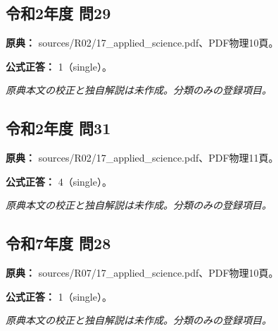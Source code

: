 \subsection{令和2年度 問29}
\label{q:r02-reg-applied-29}

\noindent\textbf{原典：} sources/R02/17\_applied\_science.pdf、PDF物理10頁。

\textbf{公式正答：} 1（single）。

\par\textit{原典本文の校正と独自解説は未作成。分類のみの登録項目。}

\subsection{令和2年度 問31}
\label{q:r02-reg-applied-31}

\noindent\textbf{原典：} sources/R02/17\_applied\_science.pdf、PDF物理11頁。

\textbf{公式正答：} 4（single）。

\par\textit{原典本文の校正と独自解説は未作成。分類のみの登録項目。}

\subsection{令和7年度 問28}
\label{q:r07-reg-applied-28}

\noindent\textbf{原典：} sources/R07/17\_applied\_science.pdf、PDF物理10頁。

\textbf{公式正答：} 1（single）。

\par\textit{原典本文の校正と独自解説は未作成。分類のみの登録項目。}
